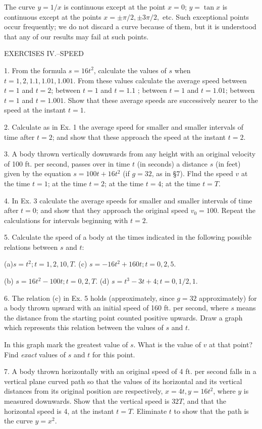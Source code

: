 \documentclass[12pt]{article}
\begin{document}
The curve $y=1/x$ is continuous except at the point $x=0$; $y=\tan x$
is continuous except at the points $x=\pm\pi/2, \pm 3\pi/2,$ etc. 
Such exceptional points occur frequently; we do not discard a curve because of them, but it is understood that any of our results may fail at such points.

\begin{center}
EXERCISES IV.--SPEED
\end{center}

1. From the formula $s=16t^{2}$, calculate the values of $s$ when $t=1,2,
1.1, 1.01, 1.001$. From these values calculate the average speed between
$t=1$ and $t=2$; between $t=1$ and $t=1.1$ ; between $t=1$ and $t=1.01$;
between $t=1$ and $t=1.001$. Show that these average speeds are 
successively nearer to the speed at the instant $t=1$.

2. Calculate as in Ex. 1 the average speed for smaller and smaller 
intervals of time after $t=2$; and show that these approach the speed at the
instant $t=2$.

3. A body thrown vertically downwards from any height with an
original velocity of 100 ft. per second, passes over in time $t$ 
(in seconds) a distance $s$ (in feet) given by the equation 
$s=100t+16t^{2}$ (if $g=32$, as in \S 7). Flnd the speed $v$ at the 
time $t=1$; at the time $t=2$; at the time $t=4$; at the time $t=T$.

4. In Ex. $3$ calculate the average speeds for smaller and smaller 
intervals of time after $t=0$; and show that they approach the original
speed $v_{0}=100$. Repeat the calculations for intervals beginning with $t=2$.

5. Calculate the speed of a body at the times indicated in the 
following possible relations between $s$ and $t$:

(a)$s=t^{2};t=1,2,10,T$. (c) $s=-16t^{2}+160t;t=0,2,5$.

(b) $s=16t^{2}-100t;t=0,2,T$. (d) $s=t^3-3t+4;t=0,1/2,1$.

6. The relation (c) in Ex. 5 holds (approximately, since $g=32$ 
approximately) for a body thrown upward with an initial speed of 160 ft.
per second, where $s$ means the distance from the starting point counted
positive upwards. Draw a graph which represents this relation between
the values of $s$ and $t$.

In this graph mark the greatest value of $s$. What is the value of $v$ at
that point? Find {\it exact} values of $s$ and $t$ for this point.

7. A body thrown horizontally with an original speed of 4 ft. per
second falls in a vertical plane curved path so that the values of its 
horizontal and its vertical distances from its original position are respectively,
$x=4t,  y=16t^2$, where $y$ is measured downwards. Show that the vertical
speed is $32 T$, and that the horizontal speed is 4, at the instant $t=T$.
Eliminate $t$ to show that the path is the curve $y=x^{2}$.
\end{document}
